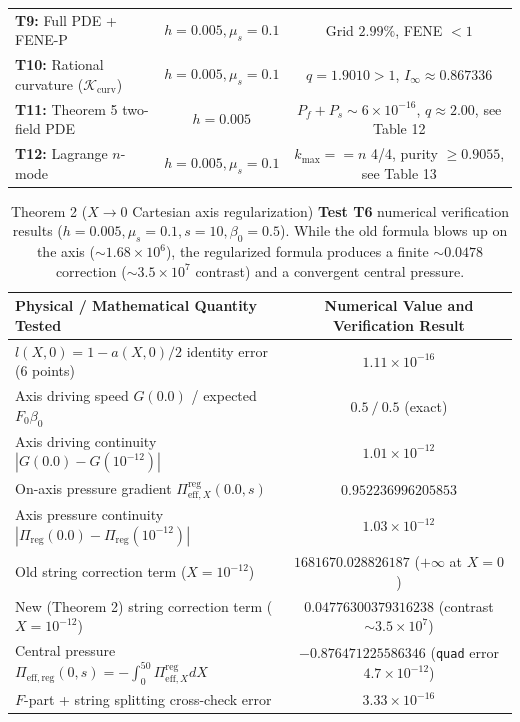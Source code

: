 \documentclass[12pt,a4paper]{article}
\begin{document}
\begin{table}[htbp]
\begin{tabularx}{\textwidth}{@{}X|c|c@{}}
\textbf{T9:} Full PDE + FENE-P & $h=0.005, \mu_s=0.1$ & \shortstack{Grid $2.99\%$, \\ FENE $< 1$} \\
\textbf{T10:} Rational curvature ($\mathcal{K}_{\mathrm{curv}}$) & $h=0.005, \mu_s=0.1$ & \shortstack{$q = 1.9010 > 1$, \\ $I_\infty \approx 0.867336$} \\
\textbf{T11:} Theorem 5 two-field PDE & $h=0.005$ & \shortstack{$P_f+P_s \sim 6\times 10^{-16}$, \\ $q \approx 2.00$, see Table 12} \\
\textbf{T12:} Lagrange $n$-mode & $h=0.005, \mu_s=0.1$ & \shortstack{$k_{\max}==n$ 4/4, \\ purity $\ge 0.9055$, see Table 13} \\
\hline
\end{tabularx}
\end{table}

\begin{table}[htbp]
\centering
\footnotesize
\setlength{\tabcolsep}{2pt}
\caption{Theorem 2 ($X \to 0$ Cartesian axis regularization) \textbf{Test T6} numerical verification results ($h=0.005, \mu_s=0.1, s=10, \beta_0=0.5$). While the old formula blows up on the axis ($\sim 1.68 \times 10^6$), the regularized formula produces a finite $\sim 0.0478$ correction ($\sim 3.5 \times 10^7$ contrast) and a convergent central pressure.}
\vspace{0.15cm}
\begin{tabular}{@{}l|c@{}}
\hline
Physical / Mathematical Quantity Tested & Numerical Value and Verification Result \\
\hline
$l(X,0) = 1 - a(X,0)/2$ identity error (6 points) & $1.11 \times 10^{-16}$ \\
Axis driving speed $G(0.0)$ / expected $F_0 \beta_0$ & $0.5 \ / \ 0.5$ (exact) \\
Axis driving continuity $|G(0.0) - G(10^{-12})|$ & $1.01 \times 10^{-12}$ \\
On-axis pressure gradient $\Pi_{\mathrm{eff}, X}^{\mathrm{reg}}(0.0, s)$ & $0.952236996205853$ \\
Axis pressure continuity $|\Pi_{\mathrm{reg}}(0.0) - \Pi_{\mathrm{reg}}(10^{-12})|$ & $1.03 \times 10^{-12}$ \\
Old string correction term ($X = 10^{-12}$) & $1681670.028826187$ ($+\infty$ at $X=0$) \\
\shortstack{New (Theorem 2) string \\ correction term ($X = 10^{-12}$)} & $0.04776300379316238$ (contrast $\sim 3.5 \times 10^7$) \\
Central pressure $\Pi_{\mathrm{eff,reg}}(0, s) = -\int_0^{50} \Pi_{\mathrm{eff}, X}^{\mathrm{reg}} dX$ & $-0.876471225586346$ (\texttt{quad} error $4.7 \times 10^{-12}$) \\
$F$-part + string splitting cross-check error & $3.33 \times 10^{-16}$ \\
\hline
\end{tabular}
\end{table}
\end{document}
